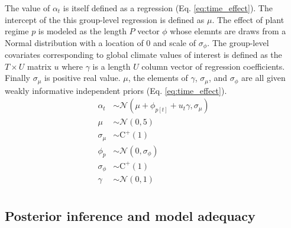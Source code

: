 \documentclass[12pt,letterpaper]{article}
\begin{document}
The value of \(\alpha_{t}\) is itself defined as a regression (Eq. \ref{eq:time_effect}). The intercept of the this group-level regression is defined as \(\mu\). The effect of plant regime \(p\) is modeled as the length \(P\) vector \(\phi\) whose elemnts are draws from a Normal distribution with a location of 0 and scale of \(\sigma_{\phi}\). The group-level covariates corresponding to global climate values of interest is defined as the \(T \times U\) matrix \(u\) where \(\gamma\) is a length \(U\) column vector of regression coefficients. Finally \(\sigma_{\mu}\) is positive real value. \(\mu\), the elements of \(\gamma\), \(\sigma_{\mu}\), and \(\sigma_{\phi}\) are all given weakly informative independent priors (Eq. \ref{eq:time_effect}).
\begin{equation}
  \begin{aligned}
    \alpha_{t} &\sim \mathcal{N}(\mu + \phi_{p[t]} + u_{t} \gamma, \sigma_{\mu}) \\
    \mu &\sim \mathcal{N}(0, 5) \\
    \sigma_{\mu} &\sim \text{C}^{+}(1) \\
    \phi_{p} &\sim \mathcal{N}(0, \sigma_{\phi}) \\
    \sigma_{\phi} &\sim \text{C}^{+}(1) \\
    \gamma &\sim \mathcal{N}(0, 1) \\
  \end{aligned}
  \label{eq:time_effect}
\end{equation}


\subsection*{Posterior inference and model adequacy}



\end{document}
